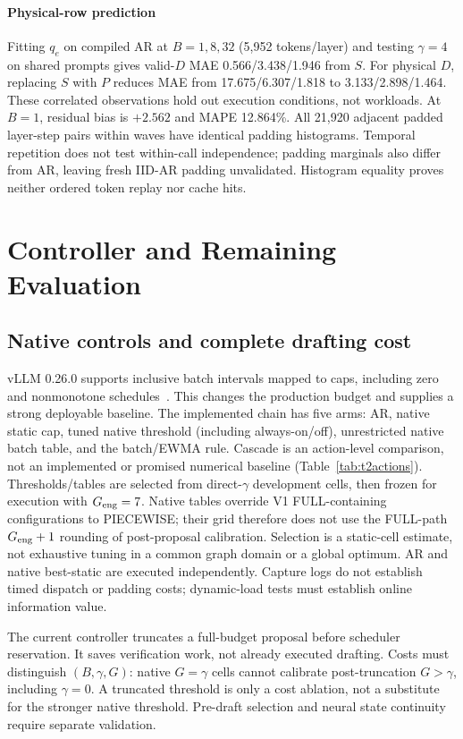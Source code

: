 \documentclass[conference,letterpaper]{IEEEtran}
\begin{document}
\paragraph{Physical-row prediction} Fitting $q_e$ on compiled AR at $B=1,8,32$ (5,952 tokens/layer) and testing $\gamma=4$ on shared prompts gives valid-$D$ MAE 0.566/3.438/1.946 from $S$. For physical $D$, replacing $S$ with $P$ reduces MAE from 17.675/6.307/1.818 to 3.133/2.898/1.464. These correlated observations hold out execution conditions, not workloads. At $B=1$, residual bias is $+2.562$ and MAPE 12.864\%. All 21,920 adjacent padded layer-step pairs within waves have identical padding histograms. Temporal repetition does not test within-call independence; padding marginals also differ from AR, leaving fresh IID-AR padding unvalidated. Histogram equality proves neither ordered token replay nor cache hits.


\section{Controller and Remaining Evaluation}
\subsection{Native controls and complete drafting cost}
vLLM 0.26.0 supports inclusive batch intervals mapped to caps, including zero and nonmonotone schedules~\cite{vllmdynamic,vllmconfig}. This changes the production budget and supplies a strong deployable baseline. The implemented chain has five arms: AR, native static cap, tuned native threshold (including always-on/off), unrestricted native batch table, and the batch/EWMA rule. Cascade is an action-level comparison, not an implemented or promised numerical baseline (Table~\ref{tab:t2actions}). Thresholds/tables are selected from direct-$\gamma$ development cells, then frozen for execution with $G_{\rm eng}=7$. Native tables override V1 FULL-containing configurations to PIECEWISE; their grid therefore does not use the FULL-path $G_{\rm eng}+1$ rounding of post-proposal calibration. Selection is a static-cell estimate, not exhaustive tuning in a common graph domain or a global optimum. AR and native best-static are executed independently. Capture logs do not establish timed dispatch or padding costs; dynamic-load tests must establish online information value.

The current controller truncates a full-budget proposal before scheduler reservation. It saves verification work, not already executed drafting. Costs must distinguish $(B,\gamma,G)$: native $G=\gamma$ cells cannot calibrate post-truncation $G>\gamma$, including $\gamma=0$. A truncated threshold is only a cost ablation, not a substitute for the stronger native threshold. Pre-draft selection and neural state continuity require separate validation.
\end{document}
